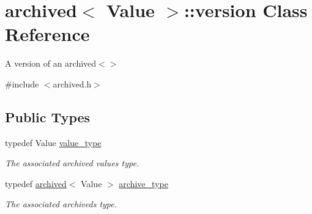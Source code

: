 \hypertarget{classarchived_1_1version}{}\section{archived$<$ Value $>$\+:\+:version Class Reference}
\label{classarchived_1_1version}


A version of an archived$<$$>$  




{\ttfamily \#include $<$archived.\+h$>$}

\subsection*{Public Types}
\begin{DoxyCompactItemize}
\item 
typedef Value \hyperlink{classarchived_1_1version_ae9028b053631ebb7832c9457cac4c29b}{value\+\_\+type}
\begin{DoxyCompactList}\small\item\em The associated archived value\textquotesingle{}s type. \end{DoxyCompactList}\item 
typedef \hyperlink{classarchived}{archived}$<$ Value $>$ \hyperlink{classarchived_1_1version_a791c80c76addc75c5ee41f31ae41817a}{archive\+\_\+type}
\begin{DoxyCompactList}\small\item\em The associated archived\textquotesingle{}s type. \end{DoxyCompactList}\end{DoxyCompactItemize}
